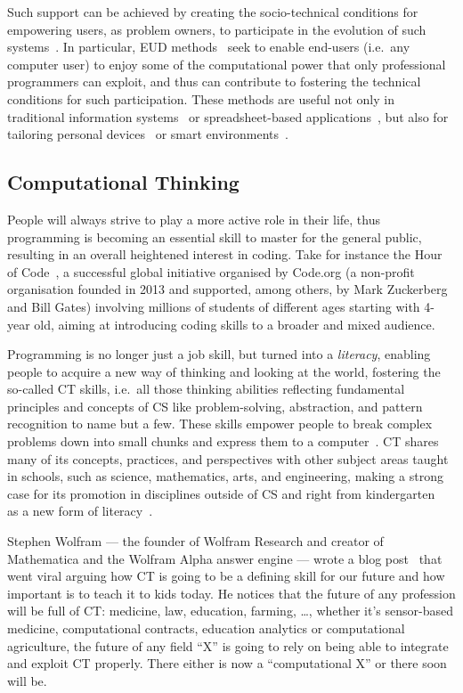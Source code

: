 Such support can be achieved by creating the socio-technical conditions for empowering users, as problem owners, to participate in the evolution of such systems~\cite{Fischer:2006kg}. In particular, \ac{EUD} methods~\cite{Lieberman:2006} seek to enable end-users (i.e.\ any computer user) to enjoy some of the computational power that only professional programmers can exploit, and thus can contribute to fostering the technical conditions for such participation. These methods are useful not only in traditional information systems~\cite{Dorner:tr} or spreadsheet-based applications~\cite{Burnett:2009ke}, but also for tailoring personal devices~\cite{Danado:2012vi,Francese:kb} or smart environments~\cite{Cabitza:2016bz,Coutaz:2016bb}.

\subsection{Computational Thinking}
People will always strive to play a more active role in their life, thus programming is becoming an essential skill to master for the general public, resulting in an overall heightened interest in coding. Take for instance the Hour of Code~\cite{HOC}, a successful global initiative organised by Code.org (a non-profit organisation founded in 2013 and supported, among others, by Mark Zuckerberg and Bill Gates) involving millions of students of different ages starting with 4-year old, aiming at introducing coding skills to a broader and mixed audience.

Programming is no longer just a job skill, but turned into a \emph{literacy}, enabling people to acquire a new way of thinking and looking at the world, fostering the so-called \acf{CT} skills, i.e.\ all those thinking abilities reflecting fundamental principles and concepts of \ac{CS} like problem-solving, abstraction, and pattern recognition to name but a few. These skills empower people to break complex problems down into small chunks and express them to a computer~\cite{Vee:2013wc}. \ac{CT} shares many of its concepts, practices, and perspectives with other subject areas taught in schools, such as science, mathematics, arts, and engineering, making a strong case for its promotion in disciplines outside of \ac{CS} and right from kindergarten~\cite{Namukasa:2015wj} as a new form of literacy~\cite{Vee:2013wc}.

Stephen Wolfram --- the founder of Wolfram Research and creator of Mathematica and the Wolfram Alpha answer engine  --- wrote a blog post~\cite{SWCT2016} that went viral arguing how \ac{CT} is going to be a defining skill for our future and how important is to teach it to kids today. He notices that the future of any profession will be full of \ac{CT}: medicine, law, education, farming, \ldots, whether it's sensor-based medicine, computational contracts, education analytics or computational agriculture, the future of any field ``X'' is going to rely on being able to integrate and exploit \ac{CT} properly. There either is now a ``computational X'' or there soon will be.

